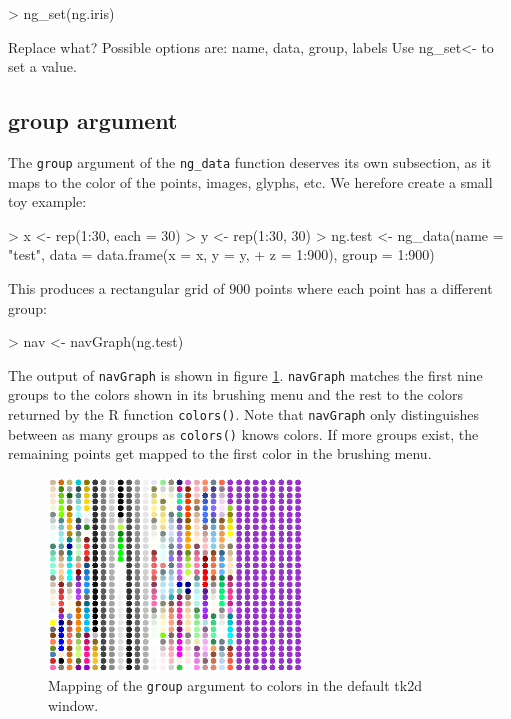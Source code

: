 \documentclass[12pt,oneside,titlepage,letter]{article}
\begin{document}
\begin{Schunk}
\begin{Sinput}
> ng_set(ng.iris)
\end{Sinput}
\begin{Soutput}
Replace what? Possible options are: name, data, group, labels 
Use ng_set<- to set a value.
\end{Soutput}
\end{Schunk}


\subsection{group argument}
The \texttt{group} argument of the \texttt{ng\_data} function deserves its own subsection, as it maps to the color of the points, images, glyphs, etc. We herefore create a small toy example:

\begin{Schunk}
\begin{Sinput}
> x <- rep(1:30, each = 30)
> y <- rep(1:30, 30)
> ng.test <- ng_data(name = "test", data = data.frame(x = x, y = y, 
+     z = 1:900), group = 1:900)
\end{Sinput}
\end{Schunk}

This produces a rectangular grid of $900$ points where each point has a different group:

\begin{Schunk}
\begin{Sinput}
> nav <- navGraph(ng.test)
\end{Sinput}
\end{Schunk}

The output of \texttt{navGraph} is shown in figure \ref{fig:tk2dCols}. \texttt{navGraph} matches the first nine groups to the colors shown in its brushing menu and the rest to the colors returned by the R function \texttt{colors()}. Note that \texttt{navGraph} only distinguishes between as many groups as \texttt{colors()} knows colors. If more groups exist, the remaining points get mapped to the first color in the brushing menu.

\begin{figure}[h]
  \label{fig:tk2dCols}
  \centering
  \includegraphics[width = 0.6\textwidth]{img/tk2dcolors.png}
  \caption{Mapping of the \texttt{group} argument to colors in the default tk2d window.}  
\end{figure}
\end{document}
